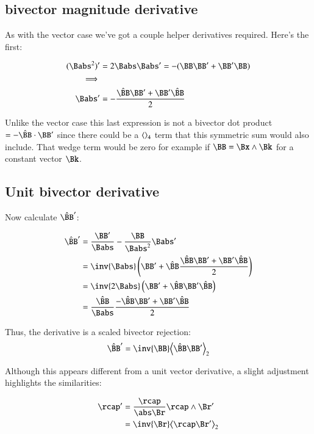 \subsection{bivector magnitude derivative }

As with the vector case we've got a couple helper derivatives required.  Here's the first:

\begin{align*}
({\Babs^2})' &= 2\Babs\Babs' = -(\BB\BB' + \BB'\BB) \\
\implies \\
{\Babs}' &= -\frac{\Bcap\BB' + \BB'\Bcap}{2} \\
\end{align*}

Unlike the vector case this last expression is not a bivector dot product $= -\Bcap\cdot \BB'$ since there could be a
${\left\langle{{}}\right\rangle}_{4}$ term that this symmetric sum would also include.
That wedge term would be zero for example if $\BB = \Bx \wedge \Bk$ for a constant vector $\Bk$.

\subsection{Unit bivector derivative }

Now calculate $\Bcap'$:

\begin{align*}
\Bcap'
&= \frac{\BB'}{\Babs} - \frac{\BB}{\Babs^2}\Babs' \\
&= \inv{\Babs}\left( \BB' + {\Bcap}\frac{\Bcap\BB' + \BB'\Bcap}{2} \right) \\
&= \inv{2\Babs}\left( \BB' + \Bcap\BB'\Bcap \right) \\
&= \frac{\Bcap}{\Babs}\frac{-\Bcap\BB' + \BB'\Bcap}{2} \\
\end{align*}

Thus, the derivative is a scaled bivector rejection:
\begin{equation}
\Bcap' = \inv{\BB}\gpgradetwo{\Bcap\BB'}
\end{equation}

Although this appears different from a unit vector derivative, a slight adjustment highlights the
similarities:

\begin{align*}
\rcap' 
&= \frac{\rcap}{\abs\Br}\rcap \wedge \Br' \\
&= \inv{\Br}\gpgradetwo{\rcap\Br'} \\
\end{align*}

